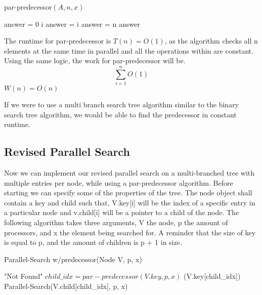\documentclass[11pt]{article}
\begin{document}
\begin{algorithm}
\caption{par-predecessor$(A, n, x)$}
\begin{algorithmic}
\STATE answer = 0
    	\RETURN i
    	\STATE answer = i
	\ENDIF
    	\STATE answer = n
	\ENDIF
	\RETURN answer
\ENDFOR
\end{algorithmic}
\end{algorithm}

The runtime for par-predecessor is $T(n) = O(1)$, as the algorithm checks all n elements at the same time in parallel and all the operations within are constant.
Using the same logic, the work for par-predecessor will be. $$\sum_{i=1}^{n}O(1)$$
$W(n) = O(n)$

If we were to use a multi branch search tree algorithm similar to the binary search tree algorithm, we would be able to find the predecessor in  constant runtime. 


\subsection{Revised Parallel Search}

Now we can implement our revised parallel search on a multi-branched tree with multiple entries per node, while using a par-predecessor algorithm. Before starting we can specify some of the properties of the tree. The node object shall contain a key and child such that, V.key[i] will be the index of a specific entry in a particular node and v.child[i] will be a pointer to a child of the node. The following algorithm takes three arguments, V the node, p the amount of processors, and x the element being searched for. A reminder that the size of key is equal to p, and the amount of children is p + 1 in size.

\begin{algorithm}
\caption{Parallel-Search w/predecessor(Node V, p, x)}
\begin{algorithmic}
	\RETURN "Not Found"
\ENDIF
\STATE $child\_idx = par-predecessor(V.key, p, x)$
	\RETURN (V.key[child\_idx])
\ELSE
	\RETURN Parallel-Search(V.child[child\_idx], p, x)
\ENDIF
\end{algorithmic}
\end{algorithm}
\end{document}
